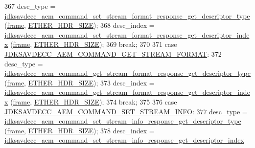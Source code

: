 \begin{DoxyCode}
367         desc\_type = 
      \hyperlink{group__command__set__stream__format__response_ga236db9fb302ab75ca2403531040254c8}{jdksavdecc\_aem\_command\_set\_stream\_format\_response\_get\_descriptor\_type}
      (\hyperlink{gst__avb__playbin_8c_ac8e710e0b5e994c0545d75d69868c6f0}{frame}, \hyperlink{namespaceavdecc__lib_a6c827b1a0d973e18119c5e3da518e65ca9512ad9b34302ba7048d88197e0a2dc0}{ETHER\_HDR\_SIZE});
368         desc\_index = 
      \hyperlink{group__command__set__stream__format__response_gad537666f50834335936b9c8147d02110}{jdksavdecc\_aem\_command\_set\_stream\_format\_response\_get\_descriptor\_index}
      (\hyperlink{gst__avb__playbin_8c_ac8e710e0b5e994c0545d75d69868c6f0}{frame}, \hyperlink{namespaceavdecc__lib_a6c827b1a0d973e18119c5e3da518e65ca9512ad9b34302ba7048d88197e0a2dc0}{ETHER\_HDR\_SIZE});
369         \textcolor{keywordflow}{break};
370 
371     \textcolor{keywordflow}{case} \hyperlink{group__command_ga44127c37d4df5fa78a40d28e053ac62c}{JDKSAVDECC\_AEM\_COMMAND\_GET\_STREAM\_FORMAT}:
372         desc\_type = 
      \hyperlink{group__command__get__stream__format__response_ga241be5e90082adf05f17e1139bc77bc4}{jdksavdecc\_aem\_command\_get\_stream\_format\_response\_get\_descriptor\_type}
      (\hyperlink{gst__avb__playbin_8c_ac8e710e0b5e994c0545d75d69868c6f0}{frame}, \hyperlink{namespaceavdecc__lib_a6c827b1a0d973e18119c5e3da518e65ca9512ad9b34302ba7048d88197e0a2dc0}{ETHER\_HDR\_SIZE});
373         desc\_index = 
      \hyperlink{group__command__get__stream__format__response_ga7563eab7dd358577f64f660404bed6c9}{jdksavdecc\_aem\_command\_get\_stream\_format\_response\_get\_descriptor\_index}
      (\hyperlink{gst__avb__playbin_8c_ac8e710e0b5e994c0545d75d69868c6f0}{frame}, \hyperlink{namespaceavdecc__lib_a6c827b1a0d973e18119c5e3da518e65ca9512ad9b34302ba7048d88197e0a2dc0}{ETHER\_HDR\_SIZE});
374         \textcolor{keywordflow}{break};
375 
376     \textcolor{keywordflow}{case} \hyperlink{group__command_gab717d775edf0abc460068c111cd0ee3b}{JDKSAVDECC\_AEM\_COMMAND\_SET\_STREAM\_INFO}:
377         desc\_type = 
      \hyperlink{group__command__set__stream__info__response_ga2af288f63567f10108700f344f7ed7c2}{jdksavdecc\_aem\_command\_set\_stream\_info\_response\_get\_descriptor\_type}
      (\hyperlink{gst__avb__playbin_8c_ac8e710e0b5e994c0545d75d69868c6f0}{frame}, \hyperlink{namespaceavdecc__lib_a6c827b1a0d973e18119c5e3da518e65ca9512ad9b34302ba7048d88197e0a2dc0}{ETHER\_HDR\_SIZE});
378         desc\_index = 
      \hyperlink{group__command__set__stream__info__response_ga5beccd46178ec84a68905e0520124ef5}{jdksavdecc\_aem\_command\_set\_stream\_info\_response\_get\_descriptor\_index}

\end{DoxyCode}
